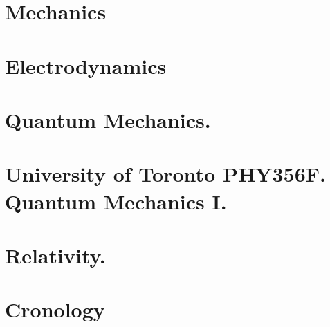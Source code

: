 \documentclass[12pt,leqno]{book}
\begin{document}
\part{Mechanics}












\part{Electrodynamics}


\part{Quantum Mechanics.}







\part{University of Toronto PHY356F.  Quantum Mechanics I.}






















\part{Relativity.}











\part{Cronology}





\end{document}
